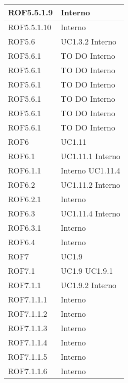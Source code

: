 \begin{center}
\begin{longtable}{| p{4cm} | p{4cm} |}
\hline
ROF5.5.1.9   &  Interno \\
\hline
ROF5.5.1.10   &  Interno \\
\hline
ROF5.6   &  UC1.3.2 \newline Interno \\
\hline
ROF5.6.1   &  TO DO \newline Interno \\
\hline
ROF5.6.1   &  TO DO \newline Interno \\
\hline
ROF5.6.1   &  TO DO \newline Interno \\
\hline
ROF5.6.1   &  TO DO \newline Interno \\
\hline
ROF5.6.1   &  TO DO \newline Interno \\
\hline
ROF5.6.1   &  TO DO \newline Interno \\
\hline
ROF6   &  UC1.11 \\
\hline
ROF6.1   &  UC1.11.1 \newline Interno \\
\hline
ROF6.1.1   &  Interno \newline UC1.11.4 \\
\hline
ROF6.2   &  UC1.11.2 \newline Interno \\
\hline
ROF6.2.1   &  Interno \\
\hline
ROF6.3   &  UC1.11.4 \newline Interno \\
\hline
ROF6.3.1   &  Interno \\
\hline
ROF6.4   &  Interno \\
\hline
ROF7   &  UC1.9 \\
\hline
ROF7.1   &  UC1.9 \newline UC1.9.1 \\
\hline
ROF7.1.1   &  UC1.9.2 \newline Interno \\
\hline
ROF7.1.1.1   &  Interno \\
\hline
ROF7.1.1.2   &  Interno \\
\hline
ROF7.1.1.3   &  Interno \\
\hline
ROF7.1.1.4   &  Interno \\
\hline
ROF7.1.1.5   &  Interno \\
\hline
ROF7.1.1.6   &  Interno \\
\hline

\end{longtable}
\end{center}
